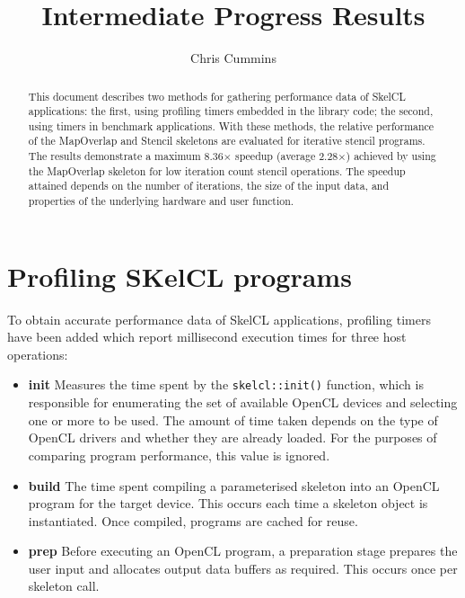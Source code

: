 
\title{Intermediate Progress Results}

\author{Chris Cummins}





\maketitle

\begin{abstract}
  \noindent
  This document describes two methods for gathering performance data
  of SkelCL applications: the first, using profiling timers embedded
  in the library code; the second, using timers in benchmark
  applications. With these methods, the relative performance of the
  MapOverlap and Stencil skeletons are evaluated for iterative stencil
  programs. The results demonstrate a maximum 8.36$\times$ speedup
  (average 2.28$\times$) achieved by using the MapOverlap skeleton for
  low iteration count stencil operations. The speedup attained depends
  on the number of iterations, the size of the input data, and
  properties of the underlying hardware and user function.
\end{abstract}

\section{Profiling SKelCL programs}

To obtain accurate performance data of SkelCL applications, profiling
timers have been added which report millisecond execution times for
three host operations:

\begin{itemize}
\item \textbf{init} Measures the time spent by the
  \texttt{skelcl::init()} function, which is responsible for
  enumerating the set of available OpenCL devices and selecting one or
  more to be used. The amount of time taken depends on the type of
  OpenCL drivers and whether they are already loaded. For the purposes
  of comparing program performance, this value is ignored.

\item \textbf{build} The time spent compiling a parameterised skeleton
  into an OpenCL program for the target device. This occurs each time
  a skeleton object is instantiated. Once compiled, programs are
  cached for reuse.

\item \textbf{prep} Before executing an OpenCL program, a preparation
  stage prepares the user input and allocates output data buffers as
  required. This occurs once per skeleton call.
\end{itemize}

